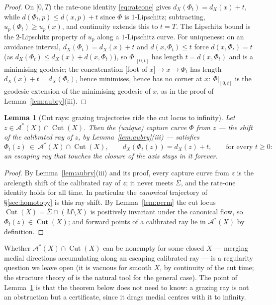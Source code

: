 \documentclass[11pt]{article}
\newtheorem{lemma}[theorem]{Lemma}
\theoremstyle{remark}
\newcommand{\X}{X}
\newcommand{\dX}{d_{\X}}
\newcommand{\Cut}{\operatorname{Cut}}
\newcommand{\Aub}{\mathcal{A}^{\ast}}
\begin{document}
\begin{proof}
On $[0,T)$ the rate-one identity \eqref{eq:rateone} gives
$\dX(\Phi_{t})=\dX(x)+t$, while $d(\Phi_{t},p)\le d(x,p)+t$ since
$\Phi$ is $1$-Lipschitz; subtracting, $u_{p}(\Phi_{t})\ge u_{p}(x)$,
and continuity extends this to $t=T$. The Lipschitz bound is the
$2$-Lipschitz property of $u_{p}$ along a $1$-Lipschitz curve. For
uniqueness: on an avoidance interval,
$\dX(\Phi_{t})=\dX(x)+t$ and $d(x,\Phi_{t})\le t$ force
$d(x,\Phi_{t})=t$ (as $\dX(\Phi_{t})\le\dX(x)+d(x,\Phi_{t})$), so
$\Phi|_{[0,t]}$ has length $t=d(x,\Phi_{t})$ and is a minimising
geodesic; the concatenation [foot of $x$]$\to x\to\Phi_{t}$ has
length $\dX(x)+t=\dX(\Phi_{t})$, hence minimises, hence has no
corner at $x$: $\Phi|_{[0,t]}$ is the geodesic extension of the
minimising geodesic of $x$, as in the proof of
Lemma~\ref{lem:aubry}(iii).
\end{proof}

\begin{lemma}[Cut rays: grazing trajectories ride the cut locus to
infinity]\label{lem:cutray}
Let $z\in\Aub(\X)\cap\Cut(\X)$. Then the (unique) capture curve
$\Phi$ from $z$ --- the shift of the calibrated ray of $z$, by
Lemma~\ref{lem:aubry}(iii) --- satisfies
\[
  \Phi_{t}(z)\ \in\ \Aub(\X)\cap\Cut(\X),\qquad
  \dX(\Phi_{t}(z))=\dX(z)+t ,
  \qquad\text{for every }t\ge0 :
\]
an escaping ray that touches the closure of the axis stays in it
forever.
\end{lemma}

\begin{proof}
By Lemma~\ref{lem:aubry}(iii) and its proof, every capture curve
from $z$ is the arclength shift of the calibrated ray of $z$; it
never meets $\Sigma$, and the rate-one identity holds for all time.
In particular the \emph{canonical} trajectory of
\S\ref{sec:homotopy} is this ray shift. By
Lemma~\ref{lem:perm} the cut locus
$\Cut(\X)=\overline{\Sigma}\cap(M\setminus\X)$ is positively
invariant under the canonical flow, so $\Phi_{t}(z)\in\Cut(\X)$; and
forward points of a calibrated ray lie in $\Aub(\X)$ by definition.
\end{proof}

Whether $\Aub(\X)\cap\Cut(\X)$ can be nonempty for some closed $\X$
--- merging medial directions accumulating along an escaping
calibrated ray --- is a regularity question we leave open (it is
vacuous for smooth $\X$, by continuity of the cut time; the structure
theory of \cite{TS,MT} is the natural tool for the general case). The
point of
Lemma~\ref{lem:cutray} is that the theorem below does not need to
know: a grazing ray is not an obstruction but a certificate, since
it drags medial centres with it to infinity.
\end{document}
